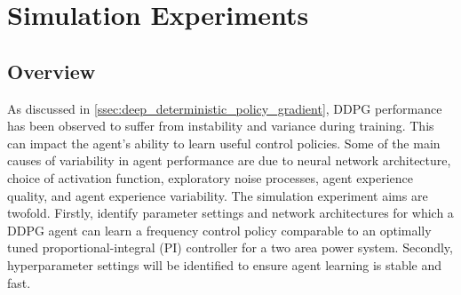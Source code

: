 \section{Simulation Experiments}\label{sec:preliminary_investigation}
\subsection{Overview}
As discussed in \textsection \ref{ssec:deep_deterministic_policy_gradient}, DDPG performance has been observed to suffer from instability and variance during training. This can impact the agent's ability to learn useful control policies. Some of the main causes of variability in agent performance are due to neural network architecture, choice of activation function, exploratory noise processes, agent experience quality, and agent experience variability. The simulation experiment aims are twofold. Firstly, identify parameter settings and network architectures for which a DDPG agent can learn a frequency control policy comparable to an optimally tuned proportional-integral (PI) controller for a two area power system. Secondly, hyperparameter settings will be identified to ensure agent learning is stable and fast.

